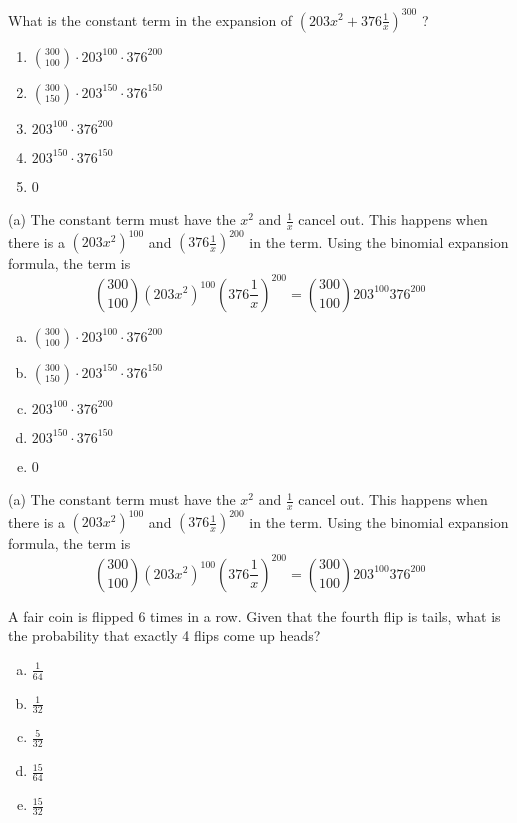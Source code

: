 \begin{solution}
\begin{solution}
\end{solution}


What is the constant term in the expansion of $(203x^2+376\frac{1}{x})^{300}$ ?
\begin{enumerate}[{(a)}]
    \item $\binom{300}{100} \cdot 203^{100} \cdot 376^{200}$
    \item $\binom{300}{150} \cdot 203^{150} \cdot 376^{150}$
    \item $203^{100} \cdot 376^{200}$
    \item $203^{150} \cdot 376^{150}$
    \item 0
\end{enumerate}

\begin{solution}
(a) The constant term must have the $x^2$ and $\frac{1}{x}$ cancel out. This happens when there is a $(203x^2)^{100}$ and $(376\frac{1}{x})^{200}$ in the term. Using the binomial expansion formula, the term is $$\binom{300}{100}(203x^2)^{100}(376\frac{1}{x})^{200} = \binom{300}{100}203^{100}376^{200}$$
\end{solution}

\newpage
\begin{enumerate}[(a)]
	\item  $\binom{300}{100} \cdot 203^{100} \cdot 376^{200}$
    
	\item  $\binom{300}{150} \cdot 203^{150} \cdot 376^{150}$
    
	\item  $203^{100} \cdot 376^{200}$
    
	\item  $203^{150} \cdot 376^{150}$
    
	\item  0

\end{enumerate}
\begin{solution}

(a) The constant term must have the $x^2$ and $\frac{1}{x}$ cancel out. This happens when there is a $(203x^2)^{100}$ and $(376\frac{1}{x})^{200}$ in the term. Using the binomial expansion formula, the term is $$\binom{300}{100}(203x^2)^{100}(376\frac{1}{x})^{200} = \binom{300}{100}203^{100}376^{200}$$

\end{solution}


A fair coin is flipped 6 times in a row. Given that the fourth flip is tails, what is the probability that exactly 4 flips come up heads?
\\
\begin{enumerate} [(a)]
    \item $\frac{1}{64}$
    \item $\frac{1}{32}$
    \item $\frac{5}{32}$
    \item $\frac{15}{64}$
    \item $\frac{15}{32}$


\end{enumerate}
\end{solution}
